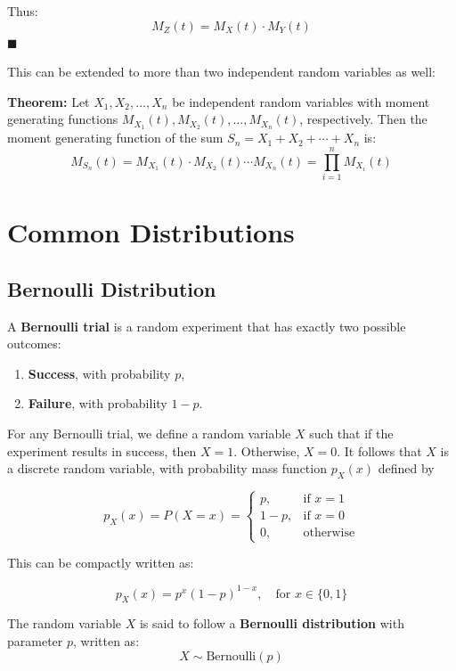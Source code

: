 \documentclass[twoside]{book}
\begin{document}
Thus:
\[
M_Z(t) = M_X(t) \cdot M_Y(t)
\]
\hfill $\blacksquare$

This can be extended to more than two independent random variables as well:
\begin{textbox}
\textbf{Theorem:} Let $X_1, X_2, \ldots, X_n$ be independent random variables with moment generating functions $M_{X_1}(t), M_{X_2}(t), \ldots, M_{X_n}(t)$, respectively. Then the moment generating function of the sum $S_n = X_1 + X_2 + \cdots + X_n$ is:
\[
M_{S_n}(t) = M_{X_1}(t) \cdot M_{X_2}(t) \cdots M_{X_n}(t) = \prod_{i=1}^n M_{X_i}(t)
\]
\end{textbox}


\chapter{Common Distributions}

\section{Bernoulli Distribution}

A \textbf{Bernoulli trial} is a random experiment that has exactly two possible outcomes:
\begin{enumerate}
    \item \textbf{Success}, with probability $p$,
    \item \textbf{Failure}, with probability $1 - p$.
\end{enumerate}

For any Bernoulli trial, we define a random variable $X$ such that if the experiment results in success, then $X = 1$. Otherwise, $X = 0$. It follows that $X$ is a discrete random
variable, with probability mass function $p_X(x)$ defined by

\begin{textbox}
    \[
p_X(x) = P(X = x) =
\begin{cases}
p, & \text{if } x = 1 \\
1 - p, & \text{if } x = 0 \\
0, & \text{otherwise}
\end{cases}
\]
\end{textbox}

This can be compactly written as:
\begin{textbox}
    \[
p_X(x) = p^x (1 - p)^{1 - x}, \quad \text{for } x \in \{0, 1\}
\]
\end{textbox}

The random variable $X$ is said to follow a \textbf{Bernoulli distribution} with parameter $p$, written as:
\[
X \sim \text{Bernoulli}(p)
\]
\end{document}
